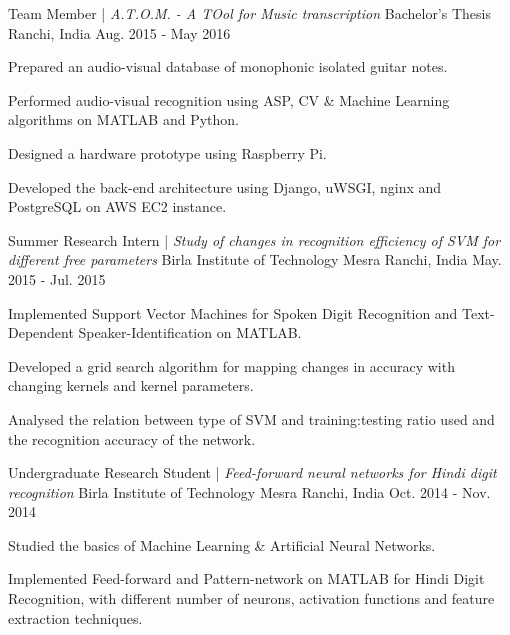 \vspace{-1em}
\begin{cventries}
  	  
  \cventry
  {Team Member | \textit{A.T.O.M. - A TOol for Music transcription}}
  {Bachelor's Thesis}
  {Ranchi, India}
  {Aug. 2015 - May 2016} 
  { \begin{cvitems}
     \item {Prepared an audio-visual database of monophonic isolated guitar notes.}
     \item {Performed audio-visual recognition using ASP, CV \& Machine Learning algorithms on MATLAB and Python.}
     \item {Designed a hardware prototype using Raspberry Pi.}
     \item {Developed the back-end architecture using Django, uWSGI, nginx and PostgreSQL on AWS EC2 instance.}
    \end{cvitems}
  } 
    
  \cventry
    {Summer Research Intern | \textit{Study of changes in recognition efficiency of SVM for different free parameters}}
    {Birla Institute of Technology Mesra}
    {Ranchi, India}
    {May. 2015 - Jul. 2015}    
    {
      \begin{cvitems}
        \item {Implemented Support Vector Machines for Spoken Digit Recognition and Text-Dependent Speaker-Identification on MATLAB.}
        \item {Developed a grid search algorithm for mapping changes in accuracy with changing kernels and kernel parameters.}
        \item {Analysed the relation between type of SVM and training:testing ratio used and the recognition accuracy of the network.}
      \end{cvitems}
    }

  \cventry
    {Undergraduate Research Student | \textit{Feed-forward neural networks for Hindi digit recognition}}
    {Birla Institute of Technology Mesra}
    {Ranchi, India}
    {Oct. 2014 - Nov. 2014}
    {
      \begin{cvitems}
        \item {Studied the basics of Machine Learning \& Artificial Neural Networks.}
        \item {Implemented Feed-forward and Pattern-network on MATLAB for Hindi Digit Recognition, with different number of neurons, activation functions and feature extraction techniques.}
      \end{cvitems}
    }
    
\end{cventries}
